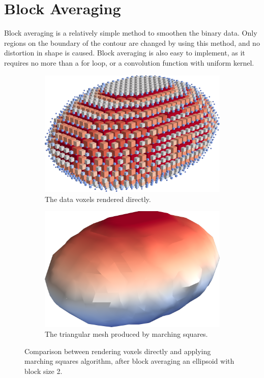 \documentclass[a4paper,10pt]{report}
\begin{document}
\section{Block Averaging}\label{sec:block_avg}

Block averaging is a relatively simple method to smoothen the binary data. Only regions on the boundary of the contour are changed by using this method, and no distortion in shape is caused. Block averaging is also easy to implement, as it requires no more than a for loop, or a convolution function with uniform kernel.
\begin{figure}[H]
    \centering
    \begin{subfigure}{.49\textwidth}
        \includegraphics[width=\textwidth]{../images/3D/Ellipsoid_blocks_block_avg.png}
    \caption{The data voxels rendered directly.}
    \label{fig:Ellipsoid_blocks_block_avg}
    \end{subfigure}
    \hfill
    \begin{subfigure}{.49\textwidth}
        \includegraphics[width=\textwidth]{../images/3D/Ellipsoid_marching_squares_block_avg.png}
    \caption{The triangular mesh produced by marching squares.}
    \label{fig:Ellipsoid_marching_squares_block_avg}
    \end{subfigure}
    \caption{Comparison between rendering voxels directly and applying marching squares algorithm, after block averaging an ellipsoid with block size 2.}
    \label{fig:Ellipsoid_block_avg}
\end{figure}
\end{document}
